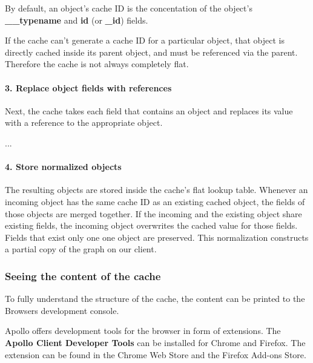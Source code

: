 By default, an object's cache ID is the concentation of the object's \textbf{\_\_typename} and \textbf{id} (or \textbf{\_id}) fields.

If the cache can't generate a cache ID for a particular object, that object is directly cached inside its parent object, and must be referenced via the parent. Therefore the cache is not always completely flat.

\paragraph{3. Replace object fields with references} 

Next, the cache takes each field that contains an object and replaces its value with a reference to the appropriate object.

...

\paragraph{4. Store normalized objects} 

The resulting objects are stored inside the cache's flat lookup table. Whenever an incoming object has the same cache ID as an existing cached object, the fields of those objects are merged together. If the incoming and the existing object share existing fields, the incoming object overwrites the cached value for those fields. Fields that exist only one one object are preserved. This normalization constructs a partial copy of the graph on our client. \cite{misc:-:apollo-client-cache-overview}


\subsubsection{Seeing the content of the cache}

To fully understand the structure of the cache, the content can be printed to the Browsers development console. 

Apollo offers development tools for the browser in form of extensions. The \textbf{Apollo Client Developer Tools} can be installed for Chrome and Firefox. The extension can be found in the Chrome Web Store and the Firefox Add-ons Store. \cite{misc:-:apollo-developer-tools}